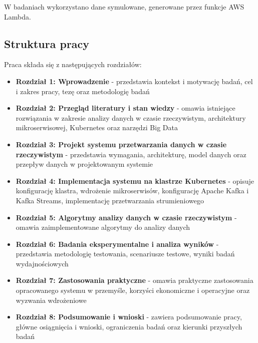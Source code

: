 W badaniach wykorzystano dane symulowane, generowane przez funkcje AWS Lambda.

\subsection{Struktura pracy}
\label{subsec:struktura}

Praca składa się z następujących rozdziałów:

\begin{itemize}
    \item \textbf{Rozdział 1: Wprowadzenie} - przedstawia kontekst i motywację badań, cel i zakres pracy, tezę oraz metodologię badań
    \item \textbf{Rozdział 2: Przegląd literatury i stan wiedzy} - omawia istniejące rozwiązania w zakresie analizy danych w czasie rzeczywistym, architektury mikroserwisowej, Kubernetes oraz narzędzi Big Data
    \item \textbf{Rozdział 3: Projekt systemu przetwarzania danych w czasie rzeczywistym} - przedstawia wymagania, architekturę, model danych oraz przepływ danych w projektowanym systemie
    \item \textbf{Rozdział 4: Implementacja systemu na klastrze Kubernetes} - opisuje konfigurację klastra, wdrożenie mikroserwisów, konfigurację Apache Kafka i Kafka Streams, implementację przetwarzania strumieniowego
    \item \textbf{Rozdział 5: Algorytmy analizy danych w czasie rzeczywistym} - omawia zaimplementowane algorytmy do analizy danych
    \item \textbf{Rozdział 6: Badania eksperymentalne i analiza wyników} - przedstawia metodologię testowania, scenariusze testowe, wyniki badań wydajnościowych
    \item \textbf{Rozdział 7: Zastosowania praktyczne} - omawia praktyczne zastosowania opracowanego systemu w przemyśle, korzyści ekonomiczne i operacyjne oraz wyzwania wdrożeniowe
    \item \textbf{Rozdział 8: Podsumowanie i wnioski} - zawiera podsumowanie pracy, główne osiągnięcia i wnioski, ograniczenia badań oraz kierunki przyszłych badań
\end{itemize} 